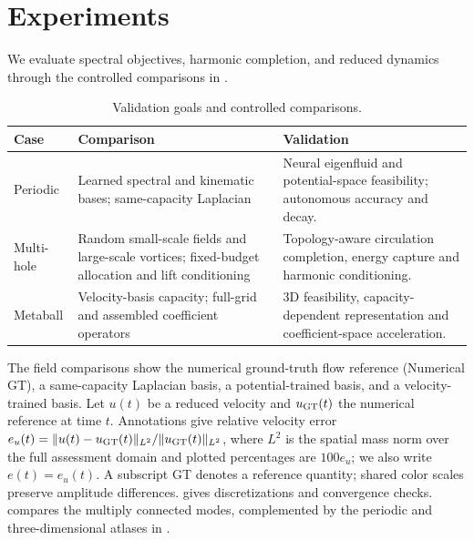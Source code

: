 \section{Experiments}
\label{sec:experiments}
We evaluate spectral objectives, harmonic completion, and reduced dynamics through the controlled comparisons in .
\begin{table}[!htb]
\centering\small
\caption{{Validation goals and controlled comparisons.}}
\label{tab:experiment-map}
\setlength{\tabcolsep}{5pt}
\renewcommand{\arraystretch}{1.13}
\begin{tabular}{@{}>{\raggedright\arraybackslash}p{.14\linewidth}>{\raggedright\arraybackslash}p{.36\linewidth}>{\raggedright\arraybackslash}p{}@{}}\toprule
Case & Comparison & {Validation}\\\midrule
Periodic & Learned spectral and kinematic bases; same-capacity Laplacian & {Neural eigenfluid and potential-space feasibility; autonomous accuracy and decay.}\\
Multi-hole & Random small-scale fields and large-scale vortices; fixed-budget allocation and lift conditioning & {Topology-aware circulation completion, energy capture and harmonic conditioning.}\\
Metaball & Velocity-basis capacity; full-grid and assembled coefficient operators & {3D feasibility, capacity-dependent representation and coefficient-space acceleration.}\\\bottomrule
\end{tabular}
\end{table}

{The field comparisons show the numerical ground-truth flow reference (Numerical GT), a same-capacity Laplacian basis, a potential-trained basis, and a velocity-trained basis. Let $u(t)$ be a reduced velocity and $u_{\rm GT}(t)$ the numerical reference at time $t$. Annotations give relative velocity error $e_u(t)=\|u(t)-u_{\rm GT}(t)\|_{L^2}/\|u_{\rm GT}(t)\|_{L^2}$, where $L^2$ is the spatial mass norm over the full assessment domain and plotted percentages are $100e_u$; we also write $e(t)=e_u(t)$. A subscript GT denotes a reference quantity; shared color scales preserve amplitude differences.  gives discretizations and convergence checks.  compares the multiply connected modes, complemented by the periodic and three-dimensional atlases in .}

